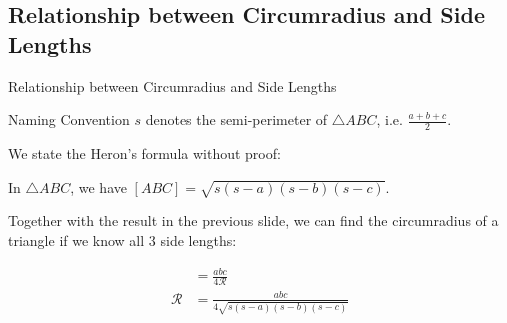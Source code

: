 \documentclass{beamer}
\begin{document}
\subsection{Relationship between Circumradius and Side Lengths}
\begin{frame}{Relationship between Circumradius and Side Lengths}
	\begin{center}
		\begin{minipage}{0.9\textwidth}
			\begin{exampleblock}{Naming Convention}
				$s$ denotes the semi-perimeter of $\triangle ABC$, i.e. $\frac{a+b+c}{2}$.
			\end{exampleblock}
			We state the Heron's formula without proof:
			\begin{theorem}
				In $\triangle ABC$, we have $[ABC] = \sqrt{s(s-a)(s-b)(s-c)}$.
			\end{theorem}
			Together with the result in the previous slide, we can find the circumradius of a triangle if we know all $3$ side lengths:
			\begin{theorem}
				\begin{align*}
					[ABC] &= \tfrac{abc}{4\mathcal{R}} \\
					\mathcal{R} &= \tfrac{abc}{4\sqrt{s(s-a)(s-b)(s-c)} }
				\end{align*}
			\end{theorem}
		\end{minipage}
	\end{center}
\end{frame}
\end{document}
